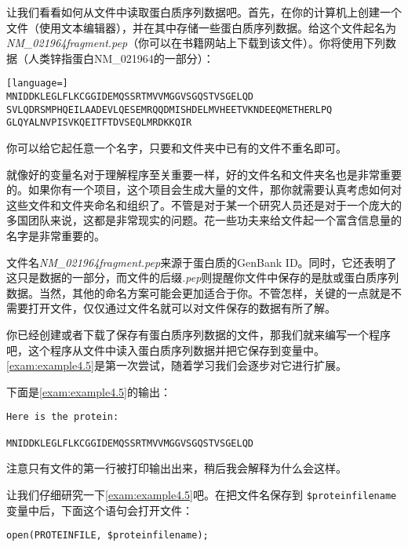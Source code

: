 让我们看看如何从文件中读取蛋白质序列数据吧。首先，在你的计算机上创建一个文件（使用文本编辑器），并在其中存储一些蛋白质序列数据。给这个文件起名为\textit{NM\_021964fragment.pep}（你可以在书籍网站上下载到该文件）。你将使用下列数据（人类锌指蛋白NM\_021964的一部分）：

\begin{lstlisting}[language=]
MNIDDKLEGLFLKCGGIDEMQSSRTMVVMGGVSGQSTVSGELQD
SVLQDRSMPHQEILAADEVLQESEMRQQDMISHDELMVHEETVKNDEEQMETHERLPQ
GLQYALNVPISVKQEITFTDVSEQLMRDKKQIR
\end{lstlisting}

你可以给它起任意一个名字，只要和文件夹中已有的文件不重名即可。

就像好的变量名对于理解程序至关重要一样，好的文件名和文件夹名也是非常重要的。如果你有一个项目，这个项目会生成大量的文件，那你就需要认真考虑如何对这些文件和文件夹命名和组织了。不管是对于某一个研究人员还是对于一个庞大的多国团队来说，这都是非常现实的问题。花一些功夫来给文件起一个富含信息量的名字是非常重要的。

文件名\textit{NM\_021964fragment.pep}来源于蛋白质的GenBank
ID。同时，它还表明了这只是数据的一部分，而文件的后缀\textit{.pep}则提醒你文件中保存的是肽或蛋白质序列数据。当然，其他的命名方案可能会更加适合于你。不管怎样，关键的一点就是不需要打开文件，仅仅通过文件名就可以对文件保存的数据有所了解。

你已经创建或者下载了保存有蛋白质序列数据的文件，那我们就来编写一个程序吧，这个程序从文件中读入蛋白质序列数据并把它保存到变量中。\autoref{exam:example4.5}是第一次尝试，随着学习我们会逐步对它进行扩展。



下面是\autoref{exam:example4.5}的输出：

\begin{lstlisting}
Here is the protein:

MNIDDKLEGLFLKCGGIDEMQSSRTMVVMGGVSGQSTVSGELQD
\end{lstlisting}

注意只有文件的第一行被打印输出出来，稍后我会解释为什么会这样。

让我们仔细研究一下\autoref{exam:example4.5}吧。在把文件名保存到 \verb|$proteinfilename|变量中后，下面这个语句会打开文件：

\begin{lstlisting}
open(PROTEINFILE, $proteinfilename);
\end{lstlisting}

